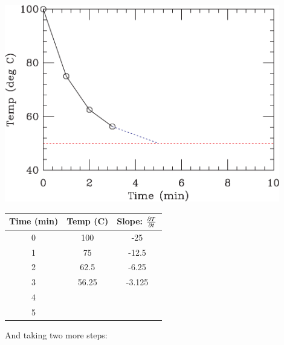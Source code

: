 \documentclass[12ampt]{article}
\def\PAR#1#2{ {{\partial #1}\over{\partial #2}} }
\begin{document}
\begin{minipage}{0.5\textwidth}
\includegraphics[width=0.9\textwidth]{fig3-crop.pdf}
\end{minipage}
\begin{minipage}{0.5\textwidth}
\begin{tabular}{|c | c | c |}
\hline
Time (min) & Temp (C) & Slope: $\PAR{T}{t}$ \\
\hline
0 & 100 & -25 \\
\hline
1 & 75 &  -12.5\\
\hline
2 & 62.5 & -6.25  \\
\hline
3 & 56.25 & -3.125 \\
\hline
4 & &  \\
\hline
5 & &  \\
\hline
\end{tabular}
\end{minipage}

And taking two more steps:
\end{document}

